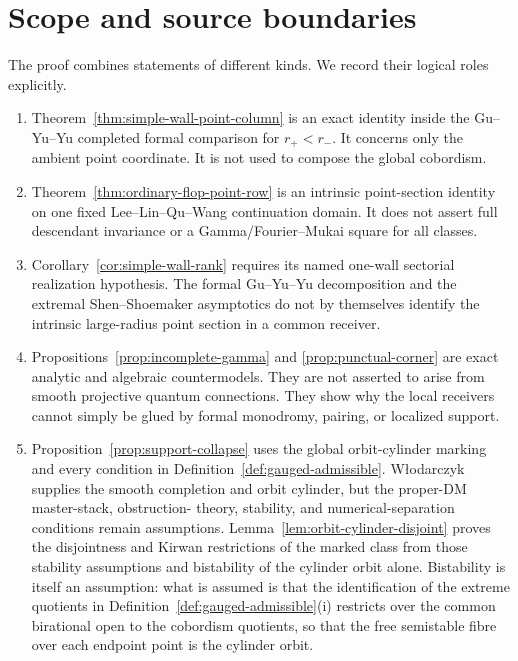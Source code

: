\section{Scope and source boundaries}
\label{sec:scope}

The proof combines statements of different kinds.  We record their logical
roles explicitly.

\begin{enumerate}[label=\textup{(\arabic*)}]
\item Theorem~\ref{thm:simple-wall-point-column} is an exact identity inside
  the Gu--Yu--Yu completed formal comparison for \(r_+<r_-\).  It concerns
  only the ambient point coordinate.  It is not used to compose the global
  cobordism.
\item Theorem~\ref{thm:ordinary-flop-point-row} is an intrinsic point-section
  identity on one fixed Lee--Lin--Qu--Wang continuation domain.  It does not
  assert full descendant invariance or a Gamma/Fourier--Mukai square for all
  classes.
\item Corollary~\ref{cor:simple-wall-rank} requires its named one-wall
  sectorial realization hypothesis.  The formal Gu--Yu--Yu decomposition and
  the extremal Shen--Shoemaker asymptotics do not by themselves identify the
  intrinsic large-radius point section in a common receiver.
\item Propositions~\ref{prop:incomplete-gamma} and
  \ref{prop:punctual-corner} are exact analytic and algebraic countermodels.
  They are not asserted to arise from smooth projective quantum connections.
  They show why the local receivers cannot simply be glued by formal
  monodromy, pairing, or localized support.
\item Proposition~\ref{prop:support-collapse} uses the global orbit-cylinder
  marking and every condition in
  Definition~\ref{def:gauged-admissible}.  W{\l}odarczyk supplies the smooth
  completion and orbit cylinder, but the proper-DM master-stack, obstruction-
  theory, stability, and numerical-separation conditions remain assumptions.
  Lemma~\ref{lem:orbit-cylinder-disjoint} proves the disjointness and Kirwan
  restrictions of the marked class from those stability assumptions and
  bistability of the cylinder orbit alone.  Bistability is itself an
  assumption: what is assumed is that the identification of the extreme
  quotients in Definition~\ref{def:gauged-admissible}\textup{(i)} restricts
  over the common birational open to the cobordism quotients, so that the free
  semistable fibre over each endpoint point is the cylinder orbit.

\end{enumerate}
